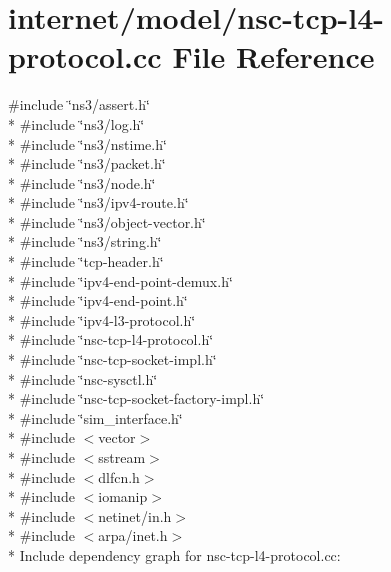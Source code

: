 \hypertarget{nsc-tcp-l4-protocol_8cc}{}\section{internet/model/nsc-\/tcp-\/l4-\/protocol.cc File Reference}
\label{nsc-tcp-l4-protocol_8cc}
{\ttfamily \#include \char`\"{}ns3/assert.\+h\char`\"{}}\\*
{\ttfamily \#include \char`\"{}ns3/log.\+h\char`\"{}}\\*
{\ttfamily \#include \char`\"{}ns3/nstime.\+h\char`\"{}}\\*
{\ttfamily \#include \char`\"{}ns3/packet.\+h\char`\"{}}\\*
{\ttfamily \#include \char`\"{}ns3/node.\+h\char`\"{}}\\*
{\ttfamily \#include \char`\"{}ns3/ipv4-\/route.\+h\char`\"{}}\\*
{\ttfamily \#include \char`\"{}ns3/object-\/vector.\+h\char`\"{}}\\*
{\ttfamily \#include \char`\"{}ns3/string.\+h\char`\"{}}\\*
{\ttfamily \#include \char`\"{}tcp-\/header.\+h\char`\"{}}\\*
{\ttfamily \#include \char`\"{}ipv4-\/end-\/point-\/demux.\+h\char`\"{}}\\*
{\ttfamily \#include \char`\"{}ipv4-\/end-\/point.\+h\char`\"{}}\\*
{\ttfamily \#include \char`\"{}ipv4-\/l3-\/protocol.\+h\char`\"{}}\\*
{\ttfamily \#include \char`\"{}nsc-\/tcp-\/l4-\/protocol.\+h\char`\"{}}\\*
{\ttfamily \#include \char`\"{}nsc-\/tcp-\/socket-\/impl.\+h\char`\"{}}\\*
{\ttfamily \#include \char`\"{}nsc-\/sysctl.\+h\char`\"{}}\\*
{\ttfamily \#include \char`\"{}nsc-\/tcp-\/socket-\/factory-\/impl.\+h\char`\"{}}\\*
{\ttfamily \#include \char`\"{}sim\+\_\+interface.\+h\char`\"{}}\\*
{\ttfamily \#include $<$vector$>$}\\*
{\ttfamily \#include $<$sstream$>$}\\*
{\ttfamily \#include $<$dlfcn.\+h$>$}\\*
{\ttfamily \#include $<$iomanip$>$}\\*
{\ttfamily \#include $<$netinet/in.\+h$>$}\\*
{\ttfamily \#include $<$arpa/inet.\+h$>$}\\*
Include dependency graph for nsc-\/tcp-\/l4-\/protocol.cc\+:
